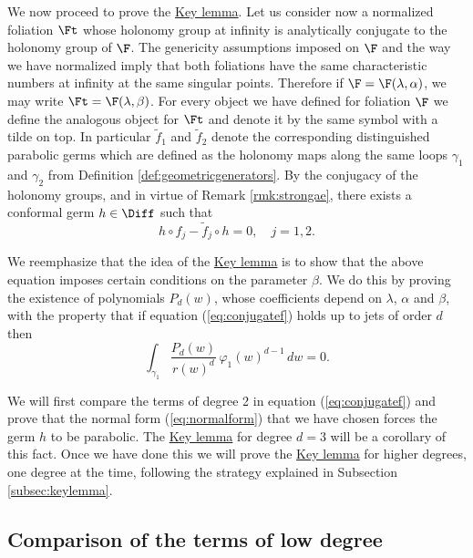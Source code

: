 


We now proceed to prove the \hyperref[lemma:key]{Key lemma}. Let us consider now a normalized foliation $\Ft$ whose holonomy group at infinity is analytically conjugate to the holonomy group of $\F$. The genericity assumptions imposed on $\F$ and the way we have normalized imply that both foliations have the same characteristic numbers at infinity at the same singular points. Therefore if $\F=\F(\lambda,\alpha)$, we may write $\Ft=\F(\lambda,\beta)$. For every object we have defined for foliation $\F$ we define the analogous object for $\Ft$ and denote it by the same symbol with a tilde on top. In particular $\tilde{f}_1$ and $\tilde{f}_2$ denote the corresponding distinguished parabolic germs which are defined as the holonomy maps along the same loops $\gamma_1$ and $\gamma_2$ from Definition \ref{def:geometricgenerators}. By the conjugacy of the holonomy groups, and in virtue of Remark \ref{rmk:strongae}, there exists a conformal germ $h\in\Diff$ such that
\begin{equation}\label{eq:conjugatef}
h\circ f_j-\tilde{f}_j\circ h=0,\quad j=1,2. 
\end{equation}

We reemphasize that the idea of the \hyperref[lemma:key]{Key lemma} is to show that the above equation imposes certain conditions on the parameter $\beta$. We do this by proving the existence of polynomials $P_d(w)$, whose coefficients depend on $\lambda$, $\alpha$ and $\beta$, with the property that if equation (\ref{eq:conjugatef}) holds up to jets of order $d$ then 
\[ \int_{\gamma_1}\frac{P_d(w)}{r(w)^d}\,\varphi_1(w)^{d-1}\,dw = 0. \]

We will first compare the terms of degree 2 in equation (\ref{eq:conjugatef}) and prove that the normal form (\ref{eq:normalform}) that we have chosen forces the germ $h$ to be parabolic. The \hyperref[lemma:key]{Key lemma} for degree $d=3$ will be a corollary of this fact. Once we have done this we will prove the \hyperref[lemma:key]{Key lemma} for higher degrees, one degree at the time, following the strategy explained in Subsection \ref{subsec:keylemma}.





\subsection{Comparison of the terms of low degree}

